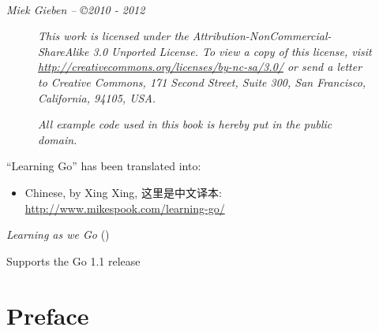 \documentclass[a4paper,twoside,openleft]{blocksbook}
\begin{document}
\vfill
\begin{center}
    \hspace*{1cm}\\[2.5ex]
    \hspace*{1cm}{\tiny\CcNote{\CcLongnameByNcSa}}
\end{center}
\begin{center}
\hspace*{1cm}\emph{Miek Gieben -- \copyright 2010 - 2012}
\end{center}
\vspace{-3em}

\newpage

\thispagestyle{empty}
\begin{figure}[H]
\emph{
This work is licensed under the Attribution-NonCommercial-ShareAlike 3.0 Unported License. To
view a copy of this license, visit \url{http://creativecommons.org/licenses/by-nc-sa/3.0/} 
or send a letter
to Creative Commons, 171 Second Street, Suite 300, San Francisco, California, 94105, USA.}
\vspace{2em}

\emph{All example code used in this book is hereby put in the public domain.}
\end{figure}

``Learning Go'' has been translated into:
\begin{itemize}
\item Chinese, by Xing Xing, 这里是中文译本: {\url{http://www.mikespook.com/learning-go/}}
\end{itemize}

\begin{center}
\vfill
\emph{Learning as we Go}
(\emph{\version})

\tiny{Supports the Go 1.1 release}
\vspace{.2\stockheight}
\end{center}

\clearpage

\tableofcontents*
\listoffigures*
\lolnoheading
\lstlistoflistings
\listofex* 
\clearpage

\chapter*{Preface}
\label{chap:preface}


\end{document}
